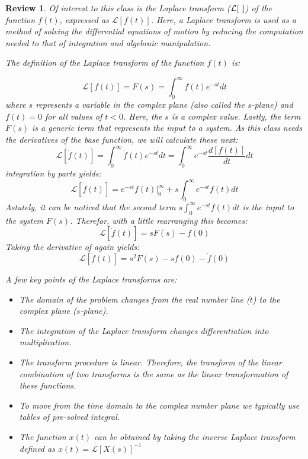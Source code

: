 \documentclass[12pt,letter]{article}
\numberwithin{ex}{section} %
\newtheorem{re}{Review}
\numberwithin{re}{section} %
\newenvironment{review}{\begin{mdframed}[middlelinewidth=2mm,roundcorner=20pt]\begin{re}\normalfont}{\end{re}\end{mdframed}}
\newcommand{\Laplace}[1]{\ensuremath{\mathcal{L}{\left[#1\right]}}}
\numberwithin{equation}{section}	%
\begin{document}
\begin{review}
	
		Of interest to this class is the Laplace transform ($\Laplace{\hspace{1ex}}$) of the function $f(t)$, expressed as $\Laplace{f(t)}$. Here, a Laplace transform is used as a method of solving the differential equations of motion by reducing the computation needed to that of integration and algebraic manipulation. 
		
		The definition of the Laplace transform of the function $f(t)$ is:
		
		\begin{equation}
				\Laplace{f(t)} = F(s) = \int_{0}^{\infty} f(t)e^{-st}dt
		\end{equation}
		where $s$ represents a variable in the complex plane (also called the $s$-plane) and $f(t)=0$ for all values of $t<0$. Here, the $s$ is a complex value. Lastly, the term $F(s)$ is a generic term that  represents the input to a system. As this class needs the derivatives of the base function, we will calculate these next:
		\begin{equation}
			\Laplace{\dot{f}(t)} = \int_{0}^{\infty} \dot{f}(t)e^{-st}dt = \int_{0}^{\infty} e^{-st}\frac{d[f(t)]}{dt}dt 
		\end{equation}		
		integration by parts yields:
		\begin{equation}
			\Laplace{\dot{f}(t)} = e^{-st}f(t)\Big|_0^\infty+s\int_{0}^{\infty}e^{-st}f(t)dt
		\end{equation}
		Astutely, it can be noticed that the second term $s\int_{0}^{\infty}e^{-st}f(t)dt$
		is the input to the system $F(s)$. Therefor, with a little rearranging this becomes:
		\begin{equation}
			\Laplace{\dot{f}(t)} = sF(s)-f(0)
		\end{equation}
		Taking the derivative of again yields:
		\begin{equation}
			\Laplace{\ddot{f}(t)} = s^2F(s)-sf(0)-\dot{f}(0)
		\end{equation}
		
		A few key points of the Laplace transforms are:
				
		\begin{itemize}
			\item The domain of the problem changes from the real number line ($t$) to the complex plane ($s$-plane).
			\item The integration of the Laplace transform changes differentiation into multiplication.
			\item The transform procedure is linear. Therefore, the transform of the linear combination of two transforms is the same as the linear transformation of these functions. 
			\item To move from the time domain to the complex number plane we typically use tables of pre-solved integral. 
			\item The function $x(t)$ can be obtained by taking the inverse Laplace transform defined as $x(t) = \Laplace{X(s)}^{-1}$
		\end{itemize}


\end{review}
\end{document}
